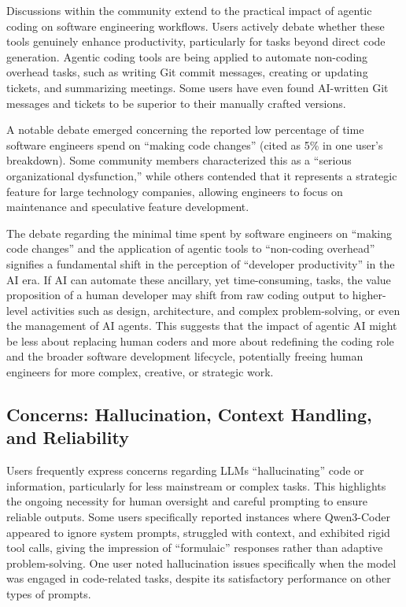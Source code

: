 Discussions within the community extend to the practical impact of agentic coding on software engineering workflows. Users actively debate whether these tools genuinely enhance productivity, particularly for tasks beyond direct code generation.\cite{hackernews_qwen3coder_2025} Agentic coding tools are being applied to automate non-coding overhead tasks, such as writing Git commit messages, creating or updating tickets, and summarizing meetings.\cite{hackernews_qwen3coder_2025} Some users have even found AI-written Git messages and tickets to be superior to their manually crafted versions.\cite{hackernews_qwen3coder_2025}

A notable debate emerged concerning the reported low percentage of time software engineers spend on ``making code changes'' (cited as 5\% in one user's breakdown). Some community members characterized this as a ``serious organizational dysfunction,'' while others contended that it represents a strategic feature for large technology companies, allowing engineers to focus on maintenance and speculative feature development.\cite{hackernews_qwen3coder_2025}

The debate regarding the minimal time spent by software engineers on ``making code changes'' and the application of agentic tools to ``non-coding overhead'' signifies a fundamental shift in the perception of ``developer productivity'' in the AI era.\cite{hackernews_qwen3coder_2025} If AI can automate these ancillary, yet time-consuming, tasks, the value proposition of a human developer may shift from raw coding output to higher-level activities such as design, architecture, and complex problem-solving, or even the management of AI agents. This suggests that the impact of agentic AI might be less about replacing human coders and more about redefining the coding role and the broader software development lifecycle, potentially freeing human engineers for more complex, creative, or strategic work.

\subsection{Concerns: Hallucination, Context Handling, and Reliability}

Users frequently express concerns regarding LLMs ``hallucinating'' code or information, particularly for less mainstream or complex tasks.\cite{hackernews_qwen3coder_2025, reddit_localllama_qwen3coder_1_2025, reddit_localllama_kimi_qwen3coder_2025} This highlights the ongoing necessity for human oversight and careful prompting to ensure reliable outputs.\cite{hackernews_qwen3coder_2025} Some users specifically reported instances where Qwen3-Coder appeared to ignore system prompts, struggled with context, and exhibited rigid tool calls, giving the impression of ``formulaic'' responses rather than adaptive problem-solving.\cite{reddit_localllama_kimi_qwen3coder_2025} One user noted hallucination issues specifically when the model was engaged in code-related tasks, despite its satisfactory performance on other types of prompts.\cite{reddit_localllama_qwen3coder_1_2025}

